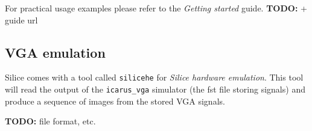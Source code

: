 \documentclass[a4]{article}
\newcommand\todo[1]{{\color{magenta}\textbf{TODO:} #1}}
\newcommand\silice{Silice}
\begin{document}
For practical usage examples please refer to the \textit{Getting started} guide. \todo{ + guide url}

\subsection{VGA emulation}

Silice comes with a tool called \texttt{silicehe} for \textit{\silice{} hardware emulation}. This tool will read the output of the \texttt{icarus\_vga} simulator (the fst file storing signals) and produce a sequence of images from the stored VGA signals.

\todo{file format, etc.}

	
\end{document}
